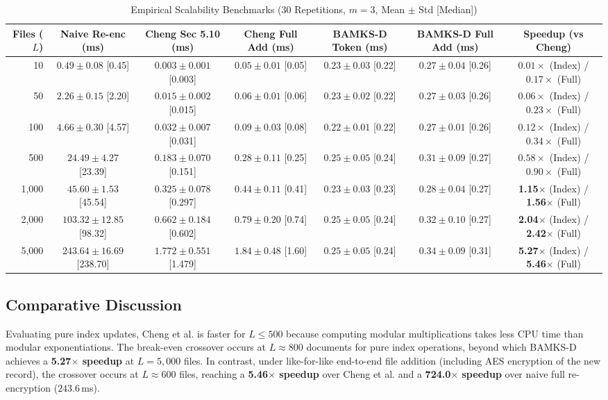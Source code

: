 \documentclass[conference]{IEEEtran}
\begin{document}
\begin{table}[htbp]
\caption{Empirical Scalability Benchmarks (30 Repetitions, $m=3$, Mean $\pm$ Std [Median])}
\label{tab:benchmarks}
\centering
\begin{tabular}{rcccccc}
\toprule
\textbf{Files ($L$)} & \textbf{Naive Re-enc (ms)} & \textbf{Cheng Sec 5.10 (ms)} & \textbf{Cheng Full Add (ms)} & \textbf{BAMKS-D Token (ms)} & \textbf{BAMKS-D Full Add (ms)} & \textbf{Speedup (vs Cheng)} \\
\midrule
10 & $0.49 \pm 0.08$ [0.45] & $0.003 \pm 0.001$ [0.003] & $0.05 \pm 0.01$ [0.05] & $0.23 \pm 0.03$ [0.22] & $0.27 \pm 0.04$ [0.26] & $0.01\times$ (Index) / $0.17\times$ (Full) \\
50 & $2.26 \pm 0.15$ [2.20] & $0.015 \pm 0.002$ [0.015] & $0.06 \pm 0.01$ [0.06] & $0.23 \pm 0.02$ [0.22] & $0.27 \pm 0.03$ [0.26] & $0.06\times$ (Index) / $0.23\times$ (Full) \\
100 & $4.66 \pm 0.30$ [4.57] & $0.032 \pm 0.007$ [0.031] & $0.09 \pm 0.03$ [0.08] & $0.22 \pm 0.01$ [0.22] & $0.27 \pm 0.01$ [0.26] & $0.12\times$ (Index) / $0.34\times$ (Full) \\
500 & $24.49 \pm 4.27$ [23.39] & $0.183 \pm 0.070$ [0.151] & $0.28 \pm 0.11$ [0.25] & $0.25 \pm 0.05$ [0.24] & $0.31 \pm 0.09$ [0.27] & $0.58\times$ (Index) / $0.90\times$ (Full) \\
1,000 & $45.60 \pm 1.53$ [45.54] & $0.325 \pm 0.078$ [0.297] & $0.44 \pm 0.11$ [0.41] & $0.23 \pm 0.03$ [0.23] & $0.28 \pm 0.04$ [0.27] & \textbf{1.15$\times$} (Index) / \textbf{1.56$\times$} (Full) \\
2,000 & $103.32 \pm 12.85$ [98.32] & $0.662 \pm 0.184$ [0.602] & $0.79 \pm 0.20$ [0.74] & $0.25 \pm 0.05$ [0.24] & $0.32 \pm 0.10$ [0.27] & \textbf{2.04$\times$} (Index) / \textbf{2.42$\times$} (Full) \\
5,000 & $243.64 \pm 16.69$ [238.70] & $1.772 \pm 0.551$ [1.479] & $1.84 \pm 0.48$ [1.60] & $0.25 \pm 0.05$ [0.24] & $0.34 \pm 0.09$ [0.31] & \textbf{5.27$\times$} (Index) / \textbf{5.46$\times$} (Full) \\
\bottomrule
\end{tabular}
\end{table}

\subsection{Comparative Discussion}
Evaluating pure index updates, Cheng et al. is faster for $L \le 500$ because computing modular multiplications takes less CPU time than modular exponentiations. The break-even crossover occurs at $L \approx 800$ documents for pure index operations, beyond which BAMKS-D achieves a \textbf{5.27$\times$ speedup} at $L=5,000$ files. In contrast, under like-for-like end-to-end file addition (including AES encryption of the new record), the crossover occurs at $L \approx 600$ files, reaching a \textbf{5.46$\times$ speedup} over Cheng et al. and a \textbf{724.0$\times$ speedup} over naive full re-encryption ($243.6$\,ms).
\end{document}
